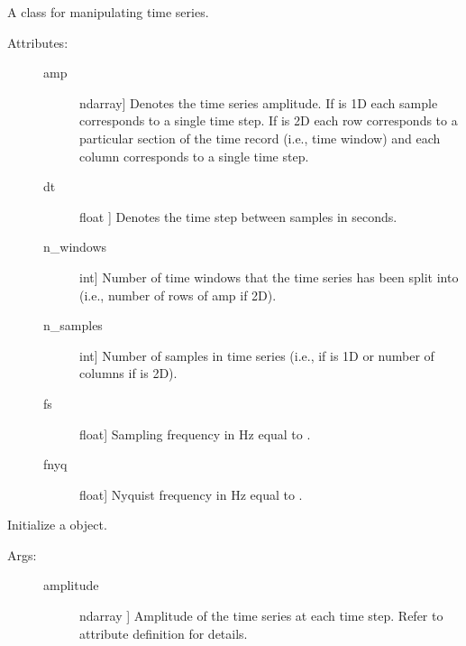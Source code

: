 \documentclass[letterpaper,10pt,english,openany,oneside]{sphinxmanual}
\begin{document}
\begin{fulllineitems}
\label{\detokenize{index:sigpropy.TimeSeries}}
A class for manipulating time series.
\begin{description}
\item[{Attributes:}] \leavevmode\begin{description}
\item[{amp}] \leavevmode{[}ndarray{]}
Denotes the time series amplitude. If  is 1D each 
sample corresponds to a single time step. If  is 2D 
each row corresponds to a particular section of the time
record (i.e., time window) and each column corresponds to a
single time step.

\item[{dt}] \leavevmode{[}float {]}
Denotes the time step between samples in seconds.

\item[{n\_windows}] \leavevmode{[}int{]}
Number of time windows that the time series has been split
into (i.e., number of rows of amp if 2D).

\item[{n\_samples}] \leavevmode{[}int{]}
Number of samples in time series (i.e.,  if 
is 1D or number of columns if  is 2D).

\item[{fs}] \leavevmode{[}float{]}
Sampling frequency in Hz equal to .

\item[{fnyq}] \leavevmode{[}float{]}
Nyquist frequency in Hz equal to .

\end{description}

\end{description}

\begin{fulllineitems}
\label{\detokenize{index:sigpropy.TimeSeries.__init__}}
Initialize a  object.
\begin{description}
\item[{Args:}] \leavevmode\begin{description}
\item[{amplitude}] \leavevmode{[}ndarray {]}
Amplitude of the time series at each time step. Refer to
attribute definition for details.


\end{description}
\end{description}
\end{fulllineitems}
\end{fulllineitems}
\end{document}
